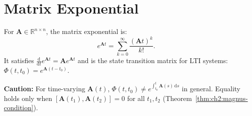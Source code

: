 \documentclass[11pt,letterpaper,openany]{book}
\theoremstyle{plain}
\theoremstyle{definition}
\theoremstyle{remark}
\newcommand{\R}{\mathbb{R}}
\newcommand{\dd}{\mathrm{d}}
\newcommand{\mat}[1]{\mathbf{#1}}
\begin{document}
\section{Matrix Exponential}

For $\mat{A} \in \R^{n \times n}$, the matrix exponential is:
\[
e^{\mat{A}t} = \sum_{k=0}^\infty \frac{(\mat{A}t)^k}{k!}.
\]
It satisfies $\frac{\dd}{\dd t} e^{\mat{A}t} = \mat{A} e^{\mat{A}t}$ and is the state
transition matrix for LTI systems: $\Phi(t, t_0) = e^{\mat{A}(t-t_0)}$.

\textbf{Caution:} For time-varying $\mat{A}(t)$, $\Phi(t, t_0) \neq e^{\int_{t_0}^t \mat{A}(s)\,\dd s}$
in general. Equality holds only when $[\mat{A}(t_1), \mat{A}(t_2)] = 0$ for all $t_1, t_2$
(Theorem~\ref{thm:ch2:magnus-condition}).


\end{document}

